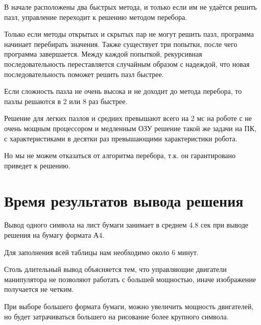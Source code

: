В начале расположены два быстрых метода, и только если им не удаётся решить пазл, управление переходит к решению методом перебора.

Только если методы открытых и скрытых пар не могут решить пазл, программа начинает перебирать значения. Также существует три попытки, после чего программа завершается. Между каждой попыткой, рекурсивная последовательность переставляется случайным образом с надеждой, что новая последовательность поможет решить пазл быстрее. 

Если сложность пазла не очень высока и не доходит до метода перебора, то пазлы решаются в $2$ или $8$ раз быстрее.

Решение для легких пазлов и средних превышают всего на 2 мс на роботе с не очень мощным процессором и медленным ОЗУ решение такой же задачи на ПК, с характеристиками в десятки раз превышающими характеристики робота.

Но мы не можем отказаться от алгоритма перебора, т.к. он гарантировано приведет к решению.

\section{Время результатов вывода решения}

Вывод одного символа на лист бумаги занимает в среднем 4.8 сек при выводе решения на бумагу формата А4.

Для заполнения всей таблицы нам необходимо около 6 минут.

Столь длительный вывод объясняется тем, что управляющие двигатели манипулятора не позволяют работать с большей мощностью, иначе изображение получается не четким.

При выборе большего формата бумаги, можно увеличить мощность двигателей, но будет затрачиваться большего на рисование более крупного символа.


